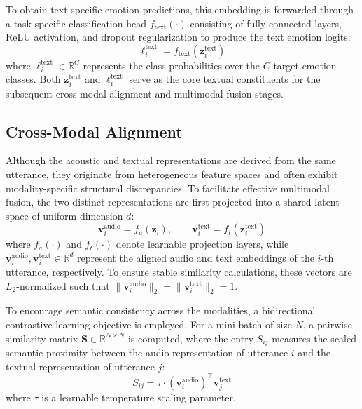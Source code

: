 To obtain text-specific emotion predictions, this embedding is forwarded through a task-specific classification head $f_{\text{text}}(\cdot)$ consisting of fully connected layers, ReLU activation, and dropout regularization to produce the text emotion logits:
\begin{equation}
	\mathbf{\ell}_i^{\text{text}} = f_{\text{text}}\left(\mathbf{z}_i^{\text{text}}\right)
\end{equation}
where $\mathbf{\ell}_i^{\text{text}} \in \mathbb{R}^{C}$ represents the class probabilities over the $C$ target emotion classes. Both $\mathbf{z}_i^{\text{text}}$ and $\mathbf{\ell}_i^{\text{text}}$ serve as the core textual constituents for the subsequent cross-modal alignment and multimodal fusion stages.

\subsection{Cross-Modal Alignment}
Although the acoustic and textual representations are derived from the same utterance, they originate from heterogeneous feature spaces and often exhibit modality-specific structural discrepancies. To facilitate effective multimodal fusion, the two distinct representations are first projected into a shared latent space of uniform dimension $d$:
\begin{equation}
	\mathbf{v}_i^{\text{audio}} = f_a(\mathbf{z}_i), \qquad \mathbf{v}_i^{\text{text}} = f_t(\mathbf{z}_i^{\text{text}})
\end{equation}
where $f_a(\cdot)$ and $f_t(\cdot)$ denote learnable projection layers, while $\mathbf{v}_i^{\text{audio}}, \mathbf{v}_i^{\text{text}} \in \mathbb{R}^{d}$ represent the aligned audio and text embeddings of the $i$-th utterance, respectively. To ensure stable similarity calculations, these vectors are $L_2$-normalized such that $\|\mathbf{v}_i^{\text{audio}}\|_2 = \|\mathbf{v}_i^{\text{text}}\|_2 = 1$.

To encourage semantic consistency across the modalities, a bidirectional contrastive learning objective is employed. For a mini-batch of size $N$, a pairwise similarity matrix $\mathbf{S} \in \mathbb{R}^{N \times N}$ is computed, where the entry $S_{ij}$ measures the scaled semantic proximity between the audio representation of utterance $i$ and the textual representation of utterance $j$:
\begin{equation}
	S_{ij} = \tau \cdot (\mathbf{v}_i^{\text{audio}})^{\top} \mathbf{v}_j^{\text{text}}
\end{equation}
where $\tau$ is a learnable temperature scaling parameter.

